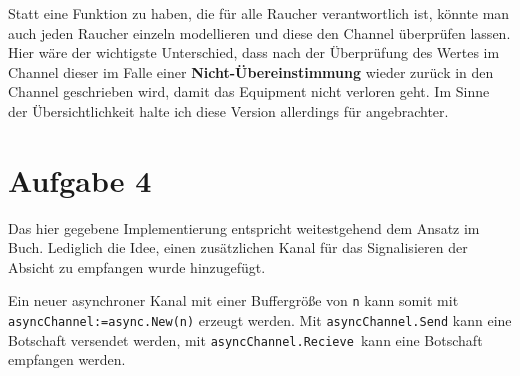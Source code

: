 \documentclass[11pt,a4paper,DIV=10,]{scrartcl}
\begin{document}
Statt eine Funktion zu haben, die für alle Raucher verantwortlich ist, könnte man auch jeden Raucher einzeln modellieren und diese den Channel überprüfen lassen. Hier wäre der wichtigste Unterschied, dass nach der Überprüfung des Wertes im Channel dieser im Falle einer \textbf{Nicht-Übereinstimmung} wieder zurück in den Channel geschrieben wird, damit das Equipment nicht verloren geht. Im Sinne der Übersichtlichkeit halte ich diese Version allerdings für angebrachter. 


\section*{Aufgabe 4}
Das hier gegebene Implementierung entspricht weitestgehend dem Ansatz im Buch. Lediglich die Idee, einen zusätzlichen Kanal für das Signalisieren der Absicht zu empfangen wurde hinzugefügt. 

Ein neuer asynchroner Kanal mit einer Buffergröße von \texttt{n} kann somit mit \\ \texttt{asyncChannel:=async.New(n)} erzeugt werden. Mit \texttt{asyncChannel.Send} kann eine Botschaft versendet werden, mit \texttt{asyncChannel.Recieve }kann eine Botschaft empfangen werden.
%
%
\end{document}
